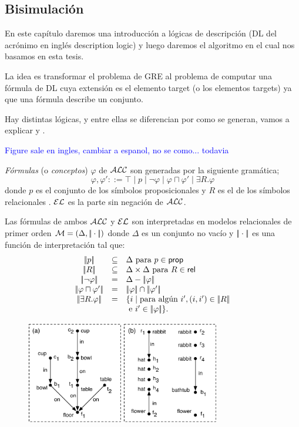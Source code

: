 \subsection{Bisimulaci\'on}


En este cap\'itulo daremos una introducci\'on a l\'ogicas de descripci\'on (DL del acr\'onimo en ingl\'es description logic) y luego daremos el algoritmo en el cual nos basamos en esta tesis.

La idea es transformar el problema de GRE al problema de computar una f\'ormula de DL cuya extensi\'on es el elemento target (o los elementos targets) ya que una f\'ormula describe un conjunto.

Hay distintas l\'ogicas, y entre ellas se diferencian por como se generan, vamos a explicar \alc y \el.

\textcolor{blue}{Figure sale en ingles, cambiar a espanol, no se como... todavia}

\emph{F\'ormulas} (o \emph{conceptos}) $\varphi$ de $\mathcal{ALC}$ son generadas por la siguiente gram\'atica;
$$
\varphi,\varphi' ::= \top \mid p \mid \neg \varphi \mid \varphi \sqcap \varphi'
\mid \exists R. \varphi
$$
donde $p$ es el conjunto de los s\'imbolos proposicionales \prop y $R$ es el de los s\'imbolos relacionales \rel. $\mathcal{EL}$ es la parte sin negaci\'on de $\mathcal{ALC}$.

Las f\'ormulas de ambos $\mathcal{ALC}$ y $\mathcal{EL}$ son interpretadas en modelos relacionales de primer orden $\mathcal{M} = (\Delta,|\!|\cdot|\!|)$ donde
$\Delta$ es un conjunto no vac\'io y $|\!|\cdot|\!|$ es una funci\'on de interpretaci\'on tal que:
$$
\begin{array}{ccl}
\interp{p} & \subseteq & \Delta  \mbox{ para $p \in \prop$}\\
\interp{R} & \subseteq & \Delta \times \Delta  \mbox{ para $R \in \rel$}\\
\interp{\neg \varphi} & = & \Delta - \interp{\varphi}\\
\interp{\varphi \sqcap \varphi'} & = & \interp{\varphi} \cap \interp{\varphi'}\\
\interp{\exists R.\varphi} & = & \{i \mid \mbox{para alg\'un } i', (i,i') \in \interp{R}\\
& & \mbox{ e } i' \in \interp{\varphi} \}.\\
\end{array}
$$

\begin{figure}[ht]
\begin{center}
\includegraphics[width=8.5cm]{figures/pic-dale-haddock.pdf}\\[0pt]
\caption{}
\label{fig:dale-haddock}
\end{center}
\end{figure}


